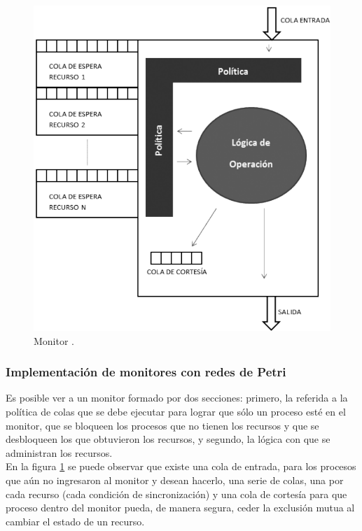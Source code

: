 \begin{figure}[H]
	\centering
	\includegraphics[scale=0.5]{Figures/marco teorico/monitor.png}
	\caption[Monitor.]{Monitor \footnotemark.}
	\label{fig:monitor}
\end{figure}   
  

\subsubsection{Implementación de monitores con redes de Petri}
Es posible ver a un monitor formado por dos secciones: primero, la referida a la política de colas que se debe ejecutar para lograr que sólo un proceso esté en el monitor, que se bloqueen los procesos que no tienen los recursos y que se desbloqueen los que obtuvieron los recursos, y segundo, la lógica con que se administran los recursos.\\
En la figura \ref{fig:monitor} se puede observar que existe una cola de entrada, para los procesos que aún no ingresaron al monitor y desean hacerlo, una serie de colas, una por cada recurso (cada condición de sincronización) y una cola de cortesía para que  proceso dentro del monitor pueda, de manera segura, ceder la exclusión mutua al cambiar el estado de un recurso.\\

